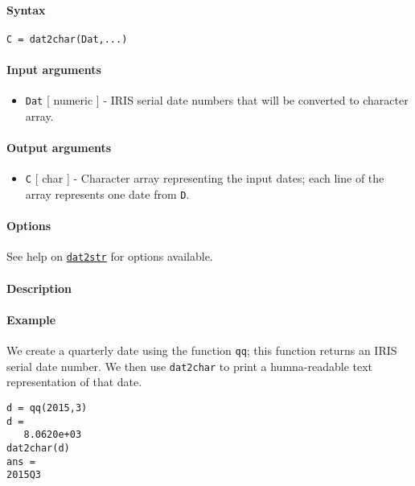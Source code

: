 


	\paragraph{Syntax}\label{syntax}

\begin{verbatim}
C = dat2char(Dat,...)
\end{verbatim}

\paragraph{Input arguments}\label{input-arguments}

\begin{itemize}
\itemsep1pt\parskip0pt
\item
  \texttt{Dat} {[} numeric {]} - IRIS serial date numbers that will be
  converted to character array.
\end{itemize}

\paragraph{Output arguments}\label{output-arguments}

\begin{itemize}
\itemsep1pt\parskip0pt
\item
  \texttt{C} {[} char {]} - Character array representing the input
  dates; each line of the array represents one date from \texttt{D}.
\end{itemize}

\paragraph{Options}\label{options}

See help on \href{dates/dat2str}{\texttt{dat2str}} for options
available.

\paragraph{Description}\label{description}

\paragraph{Example}\label{example}

We create a quarterly date using the function \texttt{qq}; this function
returns an IRIS serial date number. We then use \texttt{dat2char} to
print a humna-readable text representation of that date.

\begin{verbatim}
d = qq(2015,3)
d =
   8.0620e+03
dat2char(d)
ans =
2015Q3
\end{verbatim}


